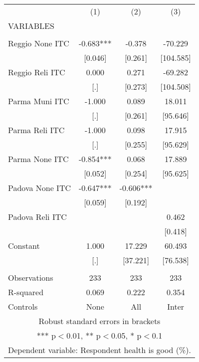 \begin{tabular}{lccc} \hline
 & (1) & (2) & (3) \\
VARIABLES &  &  &  \\ \hline
 &  &  &  \\
Reggio None ITC & -0.683*** & -0.378 & -70.229 \\
 & [0.046] & [0.261] & [104.585] \\
Reggio Reli ITC & 0.000 & 0.271 & -69.282 \\
 & [.] & [0.273] & [104.508] \\
Parma Muni ITC & -1.000 & 0.089 & 18.011 \\
 & [.] & [0.261] & [95.646] \\
Parma Reli ITC & -1.000 & 0.098 & 17.915 \\
 & [.] & [0.255] & [95.629] \\
Parma None ITC & -0.854*** & 0.068 & 17.889 \\
 & [0.052] & [0.254] & [95.625] \\
Padova None ITC & -0.647*** & -0.606*** &  \\
 & [0.059] & [0.192] &  \\
Padova Reli ITC &  &  & 0.462 \\
 &  &  & [0.418] \\
Constant & 1.000 & 17.229 & 60.493 \\
 & [.] & [37.221] & [76.538] \\
 &  &  &  \\
Observations & 233 & 233 & 233 \\
R-squared & 0.069 & 0.222 & 0.354 \\
 Controls & None & All & Inter \\ \hline
\multicolumn{4}{c}{ Robust standard errors in brackets} \\
\multicolumn{4}{c}{ *** p$<$0.01, ** p$<$0.05, * p$<$0.1} \\
\multicolumn{4}{c}{ Dependent variable: Respondent health is good (\%).} \\
\end{tabular}
